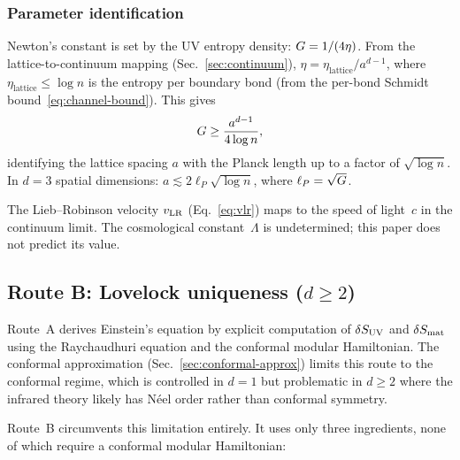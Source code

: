 \subsubsection{Parameter identification}
\label{sec:parameters}

Newton's constant is set by the UV entropy density:
$G = 1/(4\eta)$.  From the lattice-to-continuum mapping
(Sec.~\ref{sec:continuum}), $\eta = \eta_{\mathrm{lattice}}/a^{d-1}$,
where $\eta_{\mathrm{lattice}} \leq \log n$ is the entropy per
boundary bond (from the per-bond Schmidt
bound~\eqref{eq:channel-bound}).  This gives
\begin{equation}
  G \geq \frac{a^{d-1}}{4\log n},
  \label{eq:g-bound}
\end{equation}
identifying the lattice spacing $a$ with the Planck length up to a
factor of $\sqrt{\log n}$.  In $d = 3$ spatial dimensions:
$a \lesssim 2\ell_P\sqrt{\log n}$, where
$\ell_P = \sqrt{G}$.

The Lieb--Robinson velocity $v_{\mathrm{LR}}$ (Eq.~\ref{eq:vlr}) maps to the
speed of light~$c$ in the continuum limit.  The cosmological
constant~$\Lambda$ is undetermined; this paper does not predict its
value.

\subsection{Route B: Lovelock uniqueness ($d \geq 2$)}
\label{sec:route-b}

Route~A derives Einstein's equation by explicit computation of
$\delta S_{\mathrm{UV}}$ and $\delta S_{\mathrm{mat}}$ using the
Raychaudhuri equation and the conformal modular Hamiltonian.  The
conformal approximation (Sec.~\ref{sec:conformal-approx}) limits this
route to the conformal regime, which is controlled in $d = 1$ but
problematic in $d \geq 2$ where the infrared theory likely has N\'eel
order rather than conformal symmetry.

Route~B circumvents this limitation entirely.  It uses only three
ingredients, none of which require a conformal modular Hamiltonian:


